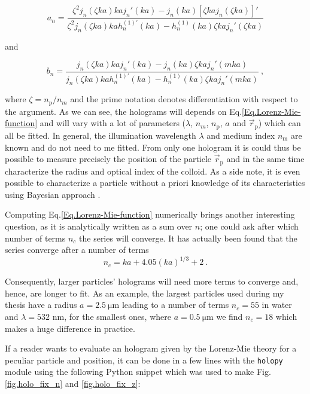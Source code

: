 \begin{equation}
	a_n = 
	\frac
	{
		\zeta^2 j_n (\zeta k a)k a j_n' (k a) - j_n(ka)[\zeta kaj_n(\zeta ka)]'
	}
	{
		\zeta^2 j_n (\zeta k a)k a h_n^{(1)'} (k a) - h_n^{(1)}(ka)\zeta kaj_n'(\zeta ka)
	}
\end{equation}

and

\begin{equation}
	b_n =
	\frac
	{
		j_n(\zeta k a) kaj_n'(ka) - j_n (ka) \zeta kaj_n'(mka)
	}
	{
		j_n(\zeta k a) kah_n^{(1)'}(ka) - h_n^{(1)} (ka) \zeta kaj_n '(mka)
	} ~,
\end{equation}


	where $\zeta = n_\mathrm{p} / n_m$ and the prime notation denotes differentiation with respect to the argument. As we can see, the holograms will depends on Eq.\ref{Eq.Lorenz-Mie-function} and will vary with a lot of parameters ($\lambda$, $n_m$, $n_\mathrm{p}$, $a$ and $\vec{r}_\mathrm{p}$) which can all be fitted. In general, the illumination wavelength $\lambda$ and medium index $n_\mathrm{m}$ are known and do not need to me fitted. From only one hologram it is could thus be possible to measure precisely the position of the particle $\vec{r}_\mathrm{p}$ and in the same time characterize the radius and optical index of the colloid. As a side note, it is even possible to characterize a particle without a priori knowledge of its characteristics using Bayesian approach \cite{gregory_bayesian_2005, dimiduk_bayesian_2016}.

Computing Eq.\ref{Eq.Lorenz-Mie-function} numerically brings another interesting question, as it is analytically written as a sum over $n$; one could ask after which number of terms $n_c$ the series will converge. It has actually been found that the series converge after a number of terms \cite{lentz_generating_1976}
\begin{equation}
	n_c = k a + 4.05 (k a)^{1/3} + 2 ~.
\end{equation}

Consequently, larger particles' holograms will need more terms to converge and, hence, are longer to fit. As an example, the largest particles used during my thesis have a radius $a = 2.5 ~ \mathrm{\mu m}$ leading to a number of terms $ n_c = 55$ in water and $\lambda = 532$ nm, for the smallest ones, where $a = 0.5 ~ \mathrm{\mu m}$ we find $n_c = 18$ which makes a huge difference in practice.

If a reader wants to evaluate an hologram given by the Lorenz-Mie theory for a peculiar particle and position, it can be done in a few lines with the \texttt{holopy} module using the following Python snippet which was used to make Fig.\ref{fig.holo_fix_n} and \ref{fig.holo_fix_z}:

